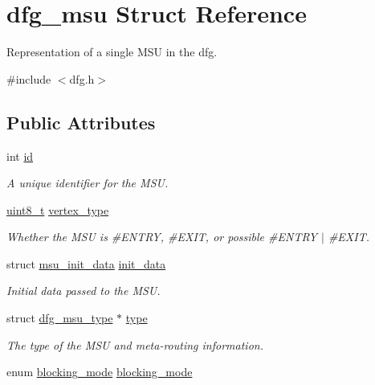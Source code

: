 \hypertarget{structdfg__msu}{\section{dfg\-\_\-msu Struct Reference}
\label{structdfg__msu}
}


Representation of a single M\-S\-U in the dfg.  




{\ttfamily \#include $<$dfg.\-h$>$}

\subsection*{Public Attributes}
\begin{DoxyCompactItemize}
\item 
int \hyperlink{structdfg__msu_a6ff9496252821697e69b9802f8d96919}{id}
\begin{DoxyCompactList}\small\item\em A unique identifier for the M\-S\-U. \end{DoxyCompactList}\item 
\hyperlink{msus_2webserver_2uthash_8h_aba7bc1797add20fe3efdf37ced1182c5}{uint8\-\_\-t} \hyperlink{structdfg__msu_a2b64c45188762a61c6ab906f7f1fccdd}{vertex\-\_\-type}
\begin{DoxyCompactList}\small\item\em Whether the M\-S\-U is \#\-E\-N\-T\-R\-Y, \#\-E\-X\-I\-T, or possible \#\-E\-N\-T\-R\-Y $\vert$ \#\-E\-X\-I\-T. \end{DoxyCompactList}\item 
struct \hyperlink{structmsu__init__data}{msu\-\_\-init\-\_\-data} \hyperlink{structdfg__msu_ae1af580efcec56f0840d058069f5a208}{init\-\_\-data}
\begin{DoxyCompactList}\small\item\em Initial data passed to the M\-S\-U. \end{DoxyCompactList}\item 
struct \hyperlink{structdfg__msu__type}{dfg\-\_\-msu\-\_\-type} $\ast$ \hyperlink{structdfg__msu_aecd16205ea67b3a51ad5df742ddc2778}{type}
\begin{DoxyCompactList}\small\item\em The type of the M\-S\-U and meta-\/routing information. \end{DoxyCompactList}\item 
enum \hyperlink{dfg_8h_af31ca3002c5b769551da6f1183bafed5}{blocking\-\_\-mode} \hyperlink{structdfg__msu_a9d0a919e5c719537d9d404f0e1de785a}{blocking\-\_\-mode}

\end{DoxyCompactItemize}
